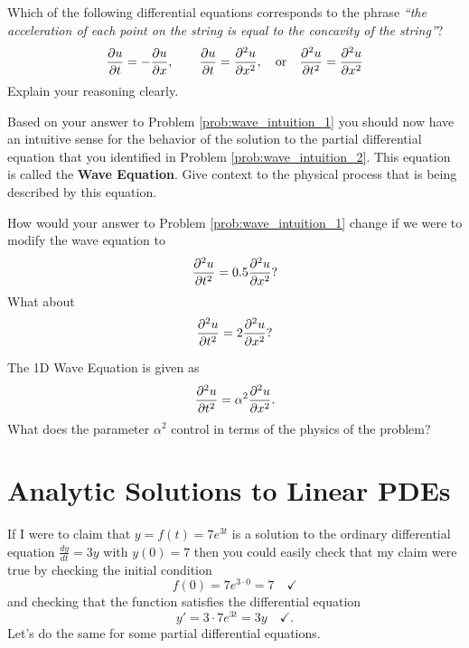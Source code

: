 \begin{problem}\label{prob:wave_intuition_2}
    Which of the following differential equations corresponds to the phrase 
        {\it ``the acceleration of each point on the string is equal to the concavity
        of the string''}?
        \[ \frac{\partial{u}}{\partial{t}} = -\frac{\partial{u}}{\partial{x}}, \qquad \frac{\partial{u}}{\partial{t}} = \frac{\partial^2{u}}{\partial{x}^2}, \quad \text{or} \quad \frac{\partial^2{u}}{\partial{t}^2} =
        \frac{\partial^2{u}}{\partial{x}^2} \]
        Explain your reasoning clearly.
\end{problem}

\begin{problem}
    Based on your answer to Problem \ref{prob:wave_intuition_1} you should now have an
    intuitive sense for the behavior of the solution to the partial differential equation
    that you identified in Problem \ref{prob:wave_intuition_2}.  This equation is called
    the {\bf Wave Equation}.  Give context to the physical process that is being described
    by this equation.
\end{problem}


\begin{problem}
    How would your answer to Problem \ref{prob:wave_intuition_1} change if we were to
    modify the wave equation to 
    \[ \frac{\partial^2{u}}{\partial{t}^2} = 0.5 \frac{\partial^2{u}}{\partial{x}^2}? \]
    What about 
    \[ \frac{\partial^2{u}}{\partial{t}^2} = 2 \frac{\partial^2{u}}{\partial{x}^2}? \]
\end{problem}

\begin{problem}
    The 1D Wave Equation is given as 
    \[ \frac{\partial^2{u}}{\partial{t}^2} = \alpha^2 \frac{\partial^2{u}}{\partial{x}^2}. \]
    What does the parameter $\alpha^2$ control in terms of the physics of the problem?
\end{problem}

\newpage\section{Analytic Solutions to Linear PDEs}
If I were to claim that $y = f(t) = 7e^{3t}$ is a solution to the ordinary differential
equation $\frac{dy}{dt} = 3y$ with $y(0) = 7$ then you could easily check that my claim
were true by checking the initial condition
\[ f(0) = 7e^{3 \cdot 0} = 7 \quad \checkmark \]
and checking that the function satisfies the differential equation
\[ y' = 3\cdot 7e^{3t} = 3 y \quad \checkmark . \]
Let's do the same for some partial differential equations.  

